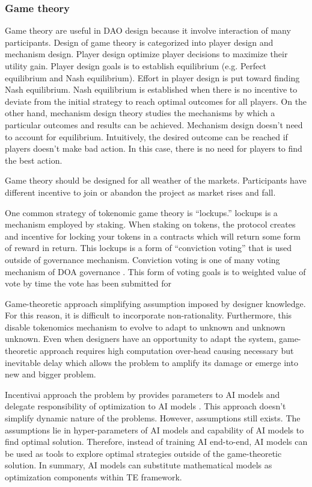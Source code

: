 \documentclass{IEEEtran}
\begin{document}
\subsubsection{Game theory}
\label{sec:org8cf8696}
Game theory are useful in DAO design because it involve interaction of many participants. Design of game theory is categorized into player design and mechanism design. Player design optimize player decisions to maximize their utility gain. Player design goals is to establish equilibrium (e.g. Perfect equilibrium and Nash equilibrium). Effort in player design is put toward finding Nash equilibrium. Nash equilibrium is established when there is no incentive to deviate from the initial strategy to reach optimal outcomes for all players. On the other hand, mechanism design theory studies the mechanisms by which a particular outcomes and results can be achieved. Mechanism design doesn't need to account for equilibrium. Intuitively, the desired outcome can be reached if players doesn't make bad action. In this case, there is no need for players to find the best action.

Game theory should be designed for all weather of the markets. Participants have different incentive to join or abandon the project as market rises and fall.

One common strategy of tokenomic game theory is ``lockups.'' lockups is a mechanism employed by staking. When staking on tokens, the protocol creates and incentive for locking your tokens in a contracts which will return some form of reward in return. This lockups is a form of ``conviction voting'' \cite{honkanen2021organizational} that is used outside of governance mechanism. Conviction voting is one of many voting mechanism of DOA governance \cite{honkanen2021organizational}. This form of voting goals is to weighted value of vote by time the vote has been submitted for

Game-theoretic approach simplifying assumption imposed by designer knowledge. For this reason, it is difficult to incorporate non-rationality. Furthermore, this disable tokenomics mechanism to evolve to adapt to unknown and unknown unknown. Even when designers have an opportunity to adapt the system, game-theoretic approach requires high computation over-head causing necessary but inevitable delay which allows the problem to amplify its damage or emerge into new and bigger problem.

Incentivai approach the problem by provides parameters to AI models and delegate responsibility of optimization to AI models \cite{grudzien2019incentive}. This approach doesn't simplify dynamic nature of the problems. However, assumptions still exists. The assumptions lie in hyper-parameters of AI models and capability of AI models to find optimal solution. Therefore, instead of training AI end-to-end, AI models can be used as tools to explore optimal strategies outside of the game-theoretic solution. In summary, AI models can substitute mathematical models as optimization components within TE framework.
\end{document}
